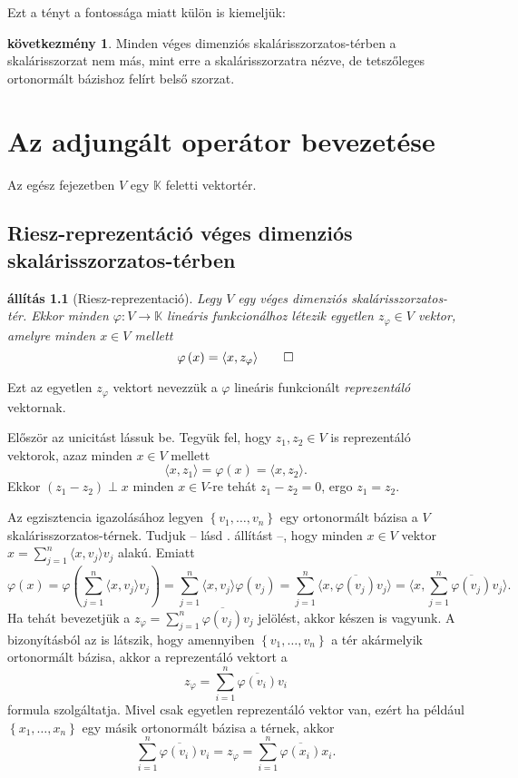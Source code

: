 \documentclass[a4paper, showtrims]{memoir}
\makeatletter
\renewenvironment{proof}[1][\proofname]
    {\par\pushQED{\qed}%
    \normalfont \topsep6\p@\@plus6\p@\relax
    \trivlist
    \item[\hskip\labelsep
        \itshape
    #1\@addpunct{:}]\ignorespaces}
    {\popQED\endtrivlist\@endpefalse}
\theoremstyle{plain}
\newtheorem{proposition}{állítás}[chapter]
\theoremstyle{remark}
\theoremstyle{definition}
\newtheorem{corollary}[proposition]{következmény}
\newcommand{\ip}[2]{\langle#1,#2\rangle}
\makeatother
\begin{document}
Ezt a tényt a fontossága miatt külön is kiemeljük:
\begin{corollary}
	Minden véges dimenziós skalárisszorzatos-térben a skalárisszorzat nem más,
	mint erre a skalárisszorzatra nézve,
	de tetszőleges ortonormált bázishoz felírt belső szorzat.
\end{corollary}

\chapter{Az adjungált operátor bevezetése}
Az egész fejezetben $V$ egy $\mathbb{K}$ feletti vektortér.
\section{Riesz-reprezentáció véges dimenziós skalárisszorzatos-térben}
\begin{proposition}[Riesz-reprezentació]\label{pr:Riesz}
	Legy $V$ egy véges dimenziós skalárisszorzatos-tér.
	Ekkor minden $\varphi:V\to\mathbb{K}$ lineáris funkcionálhoz létezik egyetlen $z_\varphi\in V$ vektor,
	amelyre minden $x\in V$ mellett
	\[
		\varphi\left( x \right)=\ip{x}{z_\varphi}
		\qedhere
	\]
\end{proposition}
Ezt az egyetlen $z_\varphi$ vektort nevezzük a $\varphi$ lineáris funkcionált \emph{reprezentáló} vektornak.
\begin{proof}
	Először az unicitást lássuk be.
	Tegyük fel, hogy $z_1,z_2\in V$ is reprezentáló vektorok,
	azaz minden $x\in V$ mellett
	\[
		\ip{x}{z_1}
		=
		\varphi\left( x \right)
		=
		\ip{x}{z_2}.
	\]
	Ekkor $(z_1-z_2)\perp x$ minden $x\in V$-re tehát $z_1-z_2=0$,
	ergo $z_1=z_2$.

	Az egzisztencia igazolásához legyen $\left\{ v_1,\ldots,v_n \right\}$ egy ortonormált bázisa a $V$ skalárisszorzatos-térnek.
    Tudjuk -- lásd . állítást --, hogy minden $x\in V$ vektor
	\begin{math}
		x=
		\sum_{j=1}^n\ip{x}{v_j}v_j
	\end{math}
	alakú.
	Emiatt
	\[
		\varphi\left( x \right)
		=
		\varphi\left(
		\sum_{j=1}^n\ip{x}{v_j}v_j
		\right)
		=
		\sum_{j=1}^n
		\ip{x}{v_j}
		\varphi\left(
		v_j
		\right)
		=
		\sum_{j=1}^n
		\ip{x}{\overline{\varphi\left(
				v_j\right)}
			v_j}
		=
		\ip{x}{
			\sum_{j=1}^n
			\overline{\varphi\left(
				v_j\right)}
			v_j}.
	\]
	Ha tehát bevezetjük a
	\begin{math}
		z_\varphi
		=
		\sum_{j=1}^n
		\overline{\varphi\left(
			v_j\right)}v_j
	\end{math}
	jelölést, akkor készen is vagyunk.
\end{proof}
A bizonyításból az is látszik, hogy amennyiben
$\left\{ v_1,\ldots,v_n \right\}$ a tér akármelyik ortonormált bázisa,
akkor a reprezentáló vektort a
\[
	z_\varphi=
	\sum_{i=1}^n\overline{\varphi\left( v_i \right)}v_i
\]
formula szolgáltatja.
Mivel csak egyetlen reprezentáló vektor van, ezért ha például
$\left\{ x_1,\ldots,x_n \right\}$ egy másik ortonormált bázisa a térnek,
akkor
\[
	\sum_{i=1}^n\overline{\varphi\left( v_i \right)}v_i
	=
	z_\varphi
	=
	\sum_{i=1}^n\overline{\varphi\left( x_i \right)}x_i.
\]
\end{document}

